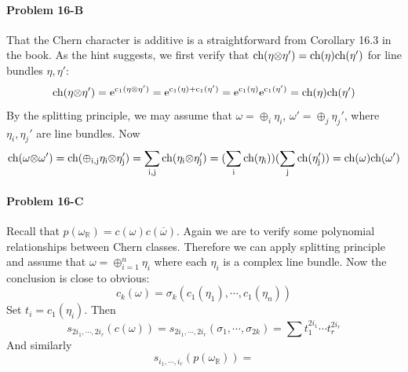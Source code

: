 \documentclass[12pt]{article}
\theoremstyle{plain}
\theoremstyle{definition}
\newcommand{\IR}{\mathbb{R}}
\newcommand{\ch}{\rm ch} %
\newcommand\tensor{{\otimes}}
\newcommand{\<}{\langle}
\renewcommand{\>}{\rangle}
\newcommand{\w}{\omega}
\begin{document}
\paragraph{Problem 16-B}
That the Chern character is additive is a straightforward from Corollary 16.3 in the book. As the hint suggests, we first verify that $\ch(\eta \tensor \eta') = \ch(\eta) \ch(\eta')$ for line bundles $\eta, \eta'$: 
$$ \ch(\eta \tensor \eta') = e^{c_1(\eta \tensor \eta')} = e^{c_1(\eta) + c_1(\eta')} = e^{c_1(\eta)} e^{c_1(\eta')} = \ch(\eta)\ch(\eta') $$
 By the splitting principle, we may assume that $\w = \oplus_i \eta_i$, $\w' = \oplus_j \eta_j'$, where $\eta_i, \eta_j'$ are line bundles. Now 
$$\ch(\w \tensor \w') = \ch(\oplus_{i,j} \eta_i \tensor \eta_j') = \sum_{i, j} \ch(\eta_i \tensor \eta_j') = (\sum_i \ch(\eta_i))(\sum_j \ch(\eta_j')) = \ch(\w)\ch(\w')$$

\paragraph{Problem 16-C}
Recall that $p(\w_\IR) = c(\w)c(\overline{\w})$. Again we are to verify some polynomial relationships between Chern classes. Therefore we can apply splitting principle and assume that $\w= \oplus_{i = 1}^n \eta_i$ where each $\eta_i$ is a complex line bundle. Now the conclusion is close to obvious: 
$$ c_k(\w) = \sigma_k(c_1(\eta_1), \cdots, c_1(\eta_n))$$
Set $t_i = c_1(\eta_i)$. Then 
$$ s_{2i_1, \cdots, 2i_r}(c(\w)) = s_{2i_1, \cdots, 2i_r}(\sigma_1, \cdots, \sigma_{2k}) = \sum t_1^{2i_1} \cdots t_r^{2i_r}$$
And similarly 
$$ s_{i_1, \cdots, i_r}(p(\w_\IR)) = $$
 
\end{document}

